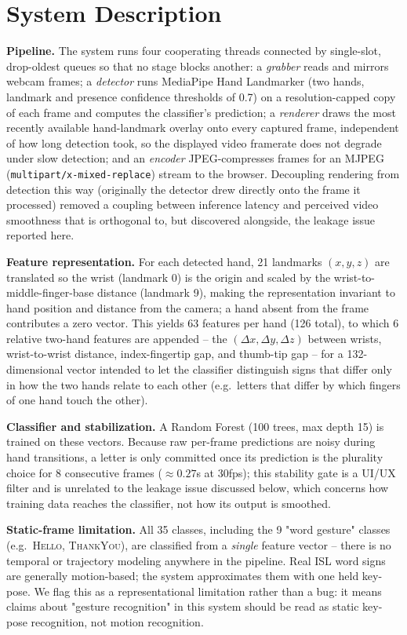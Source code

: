 \documentclass[runningheads]{llncs}
\begin{document}
\section{System Description}

\textbf{Pipeline.} The system runs four cooperating threads connected by
single-slot, drop-oldest queues so that no stage blocks another: a
\emph{grabber} reads and mirrors webcam frames; a \emph{detector} runs
MediaPipe Hand Landmarker (two hands, landmark and presence confidence
thresholds of 0.7) on a resolution-capped copy of each frame and computes
the classifier's prediction; a \emph{renderer} draws the most recently
available hand-landmark overlay onto every captured frame, independent of
how long detection took, so the displayed video framerate does not
degrade under slow detection; and an \emph{encoder} JPEG-compresses frames
for an MJPEG (\texttt{multipart/x-mixed-replace}) stream to the browser.
Decoupling rendering from detection this way (originally the detector
drew directly onto the frame it processed) removed a coupling between
inference latency and perceived video smoothness that is orthogonal to,
but discovered alongside, the leakage issue reported here.

\textbf{Feature representation.} For each detected hand, 21 landmarks
$(x,y,z)$ are translated so the wrist (landmark 0) is the origin and
scaled by the wrist-to-middle-finger-base distance (landmark 9), making
the representation invariant to hand position and distance from the
camera; a hand absent from the frame contributes a zero vector. This
yields 63 features per hand (126 total), to which 6 relative two-hand
features are appended -- the $(\Delta x,\Delta y,\Delta z)$ between
wrists, wrist-to-wrist distance, index-fingertip gap, and thumb-tip gap --
for a 132-dimensional vector intended to let the classifier distinguish
signs that differ only in how the two hands relate to each other (e.g.\
letters that differ by which fingers of one hand touch the other).

\textbf{Classifier and stabilization.} A Random Forest (100 trees, max
depth 15) is trained on these vectors. Because raw per-frame predictions
are noisy during hand transitions, a letter is only committed once its
prediction is the plurality choice for 8 consecutive frames
($\approx 0.27$s at 30fps); this stability gate is a UI/UX filter and is
unrelated to the leakage issue discussed below, which concerns how
training data reaches the classifier, not how its output is smoothed.

\textbf{Static-frame limitation.} All 35 classes, including the 9
"word gesture" classes (e.g.\ \textsc{Hello}, \textsc{ThankYou}), are
classified from a \emph{single} feature vector -- there is no temporal or
trajectory modeling anywhere in the pipeline. Real ISL word signs are
generally motion-based; the system approximates them with one held
key-pose. We flag this as a representational limitation rather than a bug:
it means claims about "gesture recognition" in this system should be
read as static key-pose recognition, not motion recognition.
\end{document}
